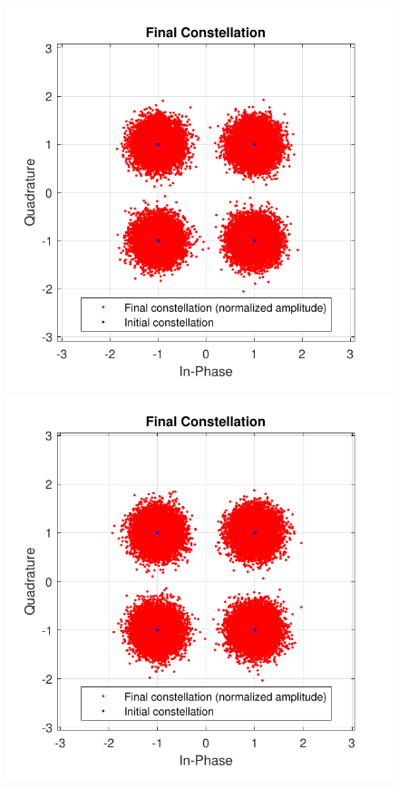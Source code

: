 \begin{figure}[h]
\begin{minipage}{0.33\textwidth}
	\end{minipage}
	\begin{minipage}{0.33\textwidth}
		\centering
		\includegraphics[width=1\textwidth]{sdf/m_qam_system/figures/simulations/03_eNoise/constFinal_G100_20km.pdf}
	\end{minipage}
	\begin{minipage}{0.33\textwidth}
		\centering
		\includegraphics[width=1\textwidth]{sdf/m_qam_system/figures/simulations/03_eNoise/constFinal_G1000_20km.pdf}

\end{minipage}
\end{figure}
